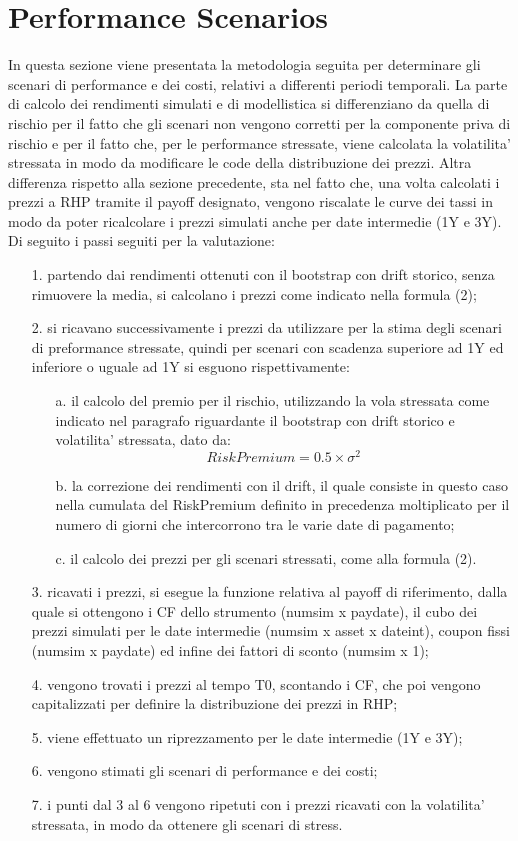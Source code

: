 \documentclass[11pt,fleqn]{extarticle}
\begin{document}
\section{Performance Scenarios}
In questa sezione viene presentata la metodologia seguita per determinare gli scenari di performance e dei costi, relativi a differenti periodi temporali. La parte di calcolo dei rendimenti simulati e di modellistica si differenziano da quella di rischio per il fatto che gli scenari non vengono corretti per la componente priva di rischio e per il fatto che, per le performance stressate, viene calcolata la volatilita' stressata in modo da modificare le code della distribuzione dei prezzi. Altra differenza rispetto alla sezione precedente, sta nel fatto che, una volta calcolati i prezzi a RHP tramite il payoff designato, vengono riscalate le curve dei tassi in modo da poter ricalcolare i prezzi simulati anche per date intermedie (1Y e 3Y). Di seguito i passi seguiti per la valutazione:
\begin{itemize}
\item[1.] partendo dai rendimenti ottenuti con il bootstrap con drift storico, senza rimuovere la media, si calcolano i prezzi come indicato nella formula (2);
\item[2.] si ricavano successivamente i prezzi da utilizzare per la stima degli scenari di preformance stressate, quindi per scenari con scadenza superiore ad 1Y ed inferiore o uguale ad 1Y si esguono rispettivamente:
\begin{itemize}
\item[a.] il calcolo del premio per il rischio, utilizzando la vola stressata come indicato nel paragrafo riguardante il bootstrap con drift storico e volatilita' stressata, dato da:
\begin{equation}
RiskPremium =  0.5\times \sigma^2
\end{equation}
\item[b.] la correzione dei rendimenti con il drift, il quale consiste in questo caso nella cumulata del RiskPremium definito in precedenza moltiplicato per il numero di giorni che intercorrono tra le varie date di pagamento;
\item[c.] il calcolo dei prezzi per gli scenari stressati, come alla formula (2).
\end{itemize}
\item[3.] ricavati i prezzi, si esegue la funzione relativa al payoff di riferimento, dalla quale si ottengono i CF dello strumento (numsim x paydate), il cubo dei prezzi simulati per le date intermedie (numsim x asset x dateint), coupon fissi (numsim x paydate) ed infine dei fattori di sconto (numsim x 1);
\item[4.] vengono trovati i prezzi al tempo T0, scontando i CF, che poi vengono capitalizzati per definire la distribuzione dei prezzi in RHP;
\item[5.] viene effettuato un riprezzamento per le date intermedie (1Y e 3Y);
\item[6.] vengono stimati gli scenari di performance e dei costi;
\item[7.] i punti dal 3 al 6 vengono ripetuti con i prezzi ricavati con la volatilita' stressata, in modo da ottenere gli scenari di stress.
\end{itemize}
\end{document}
